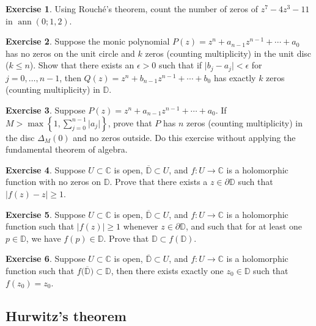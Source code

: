 \documentclass[12pt,openany]{book}
\newcommand{\ann}{\operatorname{ann}}
\newcommand{\sabs}[1]{\lvert {#1} \rvert}
\newcommand{\C}{{\mathbb{C}}}
\newcommand{\D}{{\mathbb{D}}}
\theoremstyle{plain}
\theoremstyle{remark}
\theoremstyle{definition}
\newenvironment{exbox}{%
    \def\FrameCommand{\vrule width 1pt \relax\hspace{10pt}}%
    \MakeFramed{\advance\hsize-\width\FrameRestore}%
}{%
    \endMakeFramed
}
\theoremstyle{exercise}
\newtheorem{exercise}{Exercise}[section]
\theoremstyle{example}
\begin{document}
\begin{exbox}
\begin{exercise}
Using Rouch\'e's theorem, count the number of zeros of $z^7-4z^3-11$ in $\ann(0;1,2)$.
\end{exercise}

\begin{exercise}
Suppose 
the monic polynomial
$P(z) = z^n + a_{n-1} z^{n-1} + \cdots + a_0$
has no zeros on the unit circle and $k$ zeros
(counting multiplicity)
in the unit disc ($k \leq n$).  Show that there exists an $\epsilon > 0$ such that
if $\sabs{b_j-a_j} < \epsilon$ for $j=0,\ldots,n-1$, then
$Q(z) = z^n + b_{n-1} z^{n-1} + \cdots + b_0$ has
exactly $k$ zeros (counting multiplicity) in $\D$.
\end{exercise}

\begin{exercise}
Suppose 
$P(z) = z^n + a_{n-1} z^{n-1} + \cdots + a_0$.
If $M > \max\left\{ 1, \sum_{j=0}^{n-1} \sabs{a_j} \right\}$,
prove that $P$ has $n$ zeros (counting multiplicity) in the disc $\Delta_M(0)$
and no zeros outside.  Do this exercise without applying the fundamental theorem of
algebra.
\end{exercise}

\begin{exercise}
Suppose $U \subset \C$ is open, $\overline{\D} \subset U$,
and $f \colon U \to \C$ is a holomorphic function with no zeros on
$\D$.  Prove that there exists a $z \in \partial \D$
such that $\sabs{f(z)-z} \geq 1$.
\end{exercise}

\begin{exercise}
Suppose $U \subset \C$ is open, $\overline{\D} \subset U$,
and $f \colon U \to \C$ is a holomorphic function such
that $\sabs{f(z)} \geq 1$ whenever $z \in \partial \D$,
and such that for at least one $p \in \D$, we have $f(p) \in \D$.
Prove that $\D \subset f(\D)$.
\end{exercise}

\begin{exercise}
Suppose $U \subset \C$ is open, $\overline{\D} \subset U$,
and $f \colon U \to \C$ is a holomorphic function such
that $f\bigl(\overline{\D}\bigr) \subset \D$, then there exists
exactly one $z_0 \in \D$ such that $f(z_0) = z_0$.
\end{exercise}
\end{exbox}

\subsection{Hurwitz's theorem}
\end{document}

